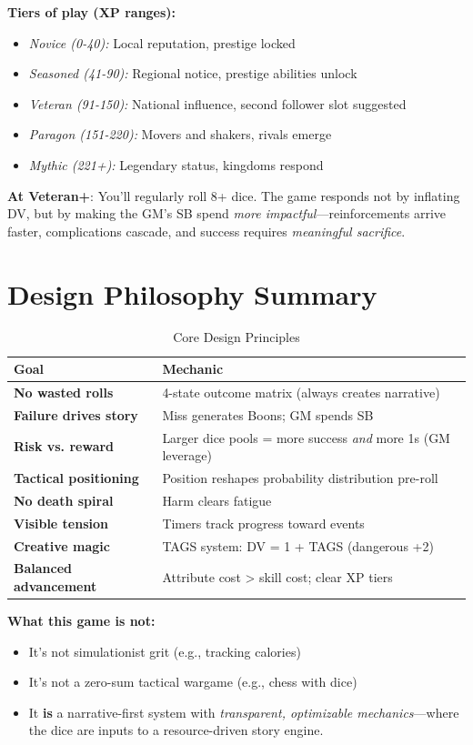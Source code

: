 \documentclass[11pt]{article}
\begin{document}
\textbf{Tiers of play (XP ranges):}
\begin{itemize}
    \item \textit{Novice (0-40):} Local reputation, prestige locked
    \item \textit{Seasoned (41-90):} Regional notice, prestige abilities unlock
    \item \textit{Veteran (91-150):} National influence, second follower slot suggested
    \item \textit{Paragon (151-220):} Movers and shakers, rivals emerge
    \item \textit{Mythic (221+):} Legendary status, kingdoms respond
\end{itemize}
\textbf{At Veteran+}: You'll regularly roll 8+ dice. The game responds not by inflating DV, but by making the GM's SB spend \textit{more impactful}—reinforcements arrive faster, complications cascade, and success requires \textit{meaningful sacrifice}.

\section{Design Philosophy Summary}

\begin{table}[h]
\centering
\caption{Core Design Principles}
\begin{tabular}{>{\bfseries}l l}
\toprule
Goal & Mechanic \\
\midrule
No wasted rolls & 4-state outcome matrix (always creates narrative) \\
Failure drives story & Miss generates Boons; GM spends SB \\
Risk vs. reward & Larger dice pools = more success \textit{and} more 1s (GM leverage) \\
Tactical positioning & Position reshapes probability distribution pre-roll \\
No death spiral & Harm clears fatigue \\
Visible tension & Timers track progress toward events \\
Creative magic & TAGS system: DV = 1 + TAGS (dangerous +2) \\
Balanced advancement & Attribute cost > skill cost; clear XP tiers \\
\bottomrule
\end{tabular}
\end{table}

\textbf{What this game is not:}
\begin{itemize}
    \item It's not simulationist grit (e.g., tracking calories)
    \item It's not a zero-sum tactical wargame (e.g., chess with dice)
    \item It \textbf{is} a narrative-first system with \textit{transparent, optimizable mechanics}—where the dice are inputs to a resource-driven story engine.
\end{itemize}
\end{document}

